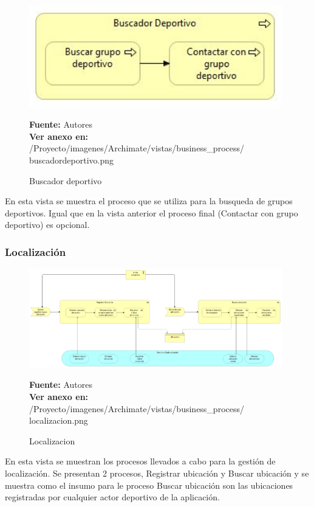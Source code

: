 \begin{figure}[!htb]
  \begin{center}
    \includegraphics[width=11cm]{./imagenes/Archimate/vistas/business_process/buscadordeportivo.png}
    \caption{Buscador deportivo}
    \label{fig:BP_BuscadorDeportivo}
    \textbf{Fuente:}  Autores \\
    \textbf{Ver anexo en:} /Proyecto/imagenes/Archimate/vistas/business\_process/
    buscadordeportivo.png
  \end{center}
\end{figure}

En esta vista se muestra el proceso que se utiliza para la busqueda de grupos deportivos. Igual que en la vista anterior el proceso final (Contactar con grupo deportivo) es opcional.

\subsubsection{Localización}

\begin{figure}[!htb]
  \begin{center}
    \includegraphics[width=11cm]{./imagenes/Archimate/vistas/business_process/localizacion.png}
    \caption{Localizacion}
    \label{fig:BP_localizacion}
    \textbf{Fuente:}  Autores \\
    \textbf{Ver anexo en:} /Proyecto/imagenes/Archimate/vistas/business\_process/
    localizacion.png
  \end{center}
\end{figure}

En esta vista se muestran los procesos llevados a cabo para la gestión de localización. Se presentan 2 procesos, Registrar ubicación y Buscar ubicación y se muestra como el insumo para le proceso Buscar ubicación son las ubicaciones registradas por cualquier actor deportivo de la aplicación.

